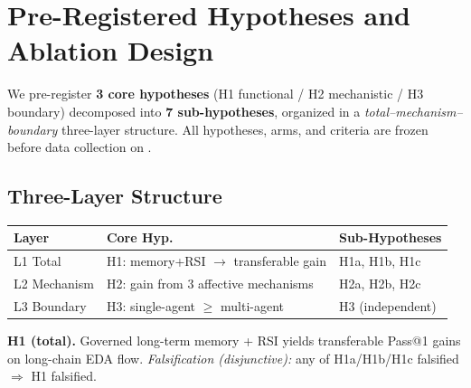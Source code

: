 \section{Pre-Registered Hypotheses and Ablation Design}
\label{sec:preregistered}

We pre-register \textbf{3 core hypotheses} (H1 functional / H2 mechanistic / H3 boundary) decomposed into \textbf{7 sub-hypotheses}, organized in a \emph{total--mechanism--boundary} three-layer structure. All hypotheses, arms, and criteria are frozen before data collection on \PreregDate.

\subsection{Three-Layer Structure}

\begin{center}
\small
\begin{tabularx}{\columnwidth}{@{}lXX@{}}
\toprule
\textbf{Layer} & \textbf{Core Hyp.} & \textbf{Sub-Hypotheses} \\
\midrule
L1 Total & H1: memory+RSI $\to$ transferable gain & H1a, H1b, H1c \\
L2 Mechanism & H2: gain from 3 affective mechanisms & H2a, H2b, H2c \\
L3 Boundary & H3: single-agent $\geq$ multi-agent & H3 (independent) \\
\bottomrule
\end{tabularx}
\end{center}

\textbf{H1 (total).} Governed long-term memory + RSI yields transferable Pass@1 gains on long-chain EDA flow. \emph{Falsification (disjunctive):} any of H1a/H1b/H1c falsified $\Rightarrow$ H1 falsified.

